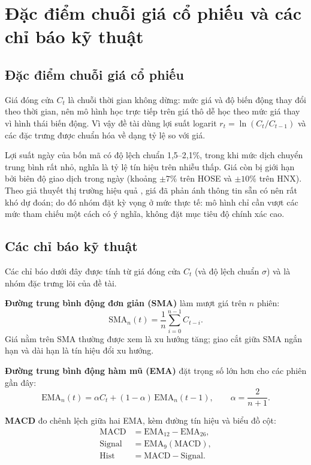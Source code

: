 \documentclass[12pt,a4paper,oneside]{report}
\begin{document}
\section{Đặc điểm chuỗi giá cổ phiếu và các chỉ báo kỹ thuật}

\subsection{Đặc điểm chuỗi giá cổ phiếu}
Giá đóng cửa $C_t$ là chuỗi thời gian không dừng: mức giá và độ biến động thay
đổi theo thời gian, nên mô hình học trực tiếp trên giá thô dễ học theo mức giá
thay vì hình thái biến động. Vì vậy đề tài dùng lợi suất logarit
$r_t=\ln(C_t/C_{t-1})$ và các đặc trưng được chuẩn hóa về dạng tỷ lệ so với giá.

Lợi suất ngày của bốn mã có độ lệch chuẩn 1,5--2,1\%, trong khi mức dịch
chuyển trung bình rất nhỏ, nghĩa là tỷ lệ tín hiệu trên nhiễu thấp. Giá còn
bị giới hạn bởi biên độ giao dịch trong ngày (khoảng $\pm 7\%$ trên HOSE và
$\pm 10\%$ trên HNX). Theo giả thuyết thị trường hiệu quả \cite{fama1970}, giá
đã phản ánh thông tin sẵn có nên rất khó dự đoán; do đó nhóm đặt kỳ vọng ở mức
thực tế: mô hình chỉ cần vượt các mức tham chiếu một cách có ý nghĩa, không đặt
mục tiêu độ chính xác cao.

\subsection{Các chỉ báo kỹ thuật}
Các chỉ báo dưới đây được tính từ giá đóng cửa $C_t$ (và độ lệch chuẩn $\sigma$)
và là nhóm đặc trưng lõi của đề tài.

\textbf{Đường trung bình động đơn giản (SMA)} làm mượt giá trên $n$ phiên:
\begin{equation}
  \mathrm{SMA}_n(t)=\frac{1}{n}\sum_{i=0}^{n-1} C_{t-i}.
  \label{eq:sma}
\end{equation}
Giá nằm trên SMA thường được xem là xu hướng tăng; giao cắt giữa SMA ngắn hạn và
dài hạn là tín hiệu đổi xu hướng.

\textbf{Đường trung bình động hàm mũ (EMA)} đặt trọng số lớn hơn cho các phiên
gần đây:
\begin{equation}
  \mathrm{EMA}_n(t)=\alpha C_t+(1-\alpha)\,\mathrm{EMA}_n(t-1),\qquad
  \alpha=\frac{2}{n+1}.
  \label{eq:ema}
\end{equation}

\textbf{MACD} đo chênh lệch giữa hai EMA, kèm đường tín hiệu và biểu đồ cột:
\begin{equation}
  \begin{aligned}
    \mathrm{MACD}&=\mathrm{EMA}_{12}-\mathrm{EMA}_{26},\\
    \mathrm{Signal}&=\mathrm{EMA}_{9}(\mathrm{MACD}),\\
    \mathrm{Hist}&=\mathrm{MACD}-\mathrm{Signal}.
  \end{aligned}
  \label{eq:macd}
\end{equation}
\end{document}
